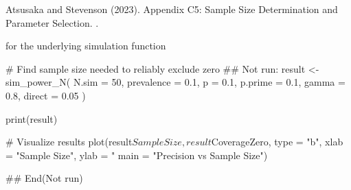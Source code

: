 \documentclass[a4paper]{book}
\begin{document}
%
\begin{References}
Atsusaka and Stevenson (2023). Appendix C5: Sample Size Determination
and Parameter Selection. .
\end{References}
%
\begin{SeeAlso}
 for the underlying simulation function
\end{SeeAlso}
%
\begin{Examples}
\begin{ExampleCode}
# Find sample size needed to reliably exclude zero
## Not run: 
result <- sim_power_N(
  N.sim = 50,
  prevalence = 0.1,
  p = 0.1,
  p.prime = 0.1,
  gamma = 0.8,
  direct = 0.05
)

print(result)

# Visualize results
plot(result$SampleSize, result$CoverageZero,
     type = "b", xlab = "Sample Size",
     ylab = "%
     main = "Precision vs Sample Size")

## End(Not run)

\end{ExampleCode}
\end{Examples}
\printindex{}
\end{document}
